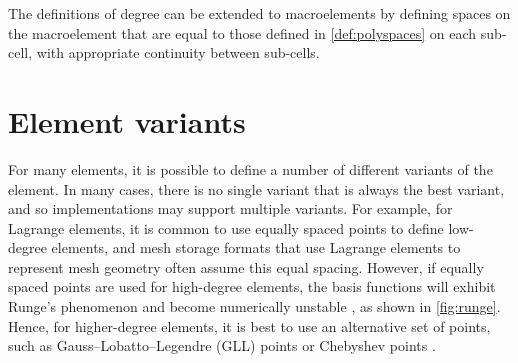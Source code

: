 \documentclass[sn-mathphys-num]{sn-jnl}%
\theoremstyle{thmstyleone}%
\theoremstyle{thmstyletwo}%
\theoremstyle{thmstylethree}%
\begin{document}
The definitions of degree can be extended to macroelements by defining spaces on the macroelement that
are equal to those defined in \cref{def:polyspaces} on each sub-cell, with appropriate continuity between sub-cells.

\section{Element variants}\label{sec:variants}
For many elements, it is possible to define a number of different variants of the element. In many cases,
there is no single variant that is always the best variant, and so implementations may support multiple variants.
For example, for Lagrange elements, it is common to use equally spaced points to define low-degree elements, and
mesh storage formats that use Lagrange elements to represent mesh geometry often assume this equal spacing. However,
if equally spaced points are used for high-degree elements, the basis functions will exhibit Runge's phenomenon
and become numerically unstable \cite{runge}, as shown in \cref{fig:runge}. Hence, for higher-degree elements, it is best to use an alternative set of points, such as
Gauss--Lobatto--Legendre (GLL) points or Chebyshev points \cite[chapter 13]{approximation-theory-practice}.
\end{document}

